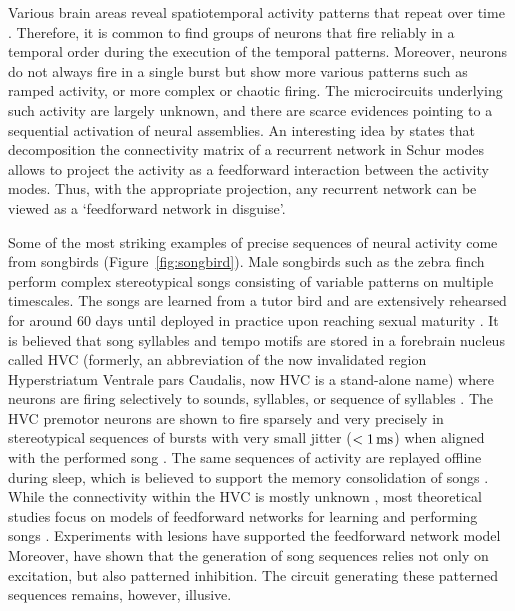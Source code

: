     Various brain areas reveal spatiotemporal activity patterns that repeat
    over time \cite[e.g.,][]{Wilson1994, Kenet2003, Berkes2011}. Therefore, it
    is common to find groups of neurons that fire reliably in a temporal order
    during the execution of the temporal patterns. Moreover, neurons do not
    always fire in a single burst but show more various patterns such as ramped
    activity, or more complex or chaotic firing. The microcircuits
    underlying such activity are largely unknown, and there are scarce
    evidences pointing to a sequential activation of neural assemblies. An
    interesting idea by \cite{Goldman2009} states that decomposition the
    connectivity matrix of a recurrent network in Schur modes allows to project
    the activity as a feedforward interaction between the activity modes. Thus,
    with the appropriate projection, any recurrent network can be viewed as a
    `feedforward network in disguise'.

    Some of the most striking examples of precise sequences of neural activity
    come from songbirds (Figure~\ref{fig:songbird}). Male songbirds such as the zebra finch perform complex
    stereotypical songs consisting of variable patterns on multiple timescales.
    The songs are learned from a tutor bird and are extensively rehearsed for
    around 60 days until deployed in practice upon reaching sexual maturity
    \citep{George1995, Doupe2004}. It is believed that song syllables and tempo
    motifs are stored in a forebrain nucleus called HVC (formerly, an
    abbreviation of the now invalidated region Hyperstriatum Ventrale pars
    Caudalis, now HVC is a stand-alone name) where neurons are firing
    selectively to sounds, syllables, or sequence of syllables \citep{Yu1996}.
    The HVC premotor neurons are shown to fire sparsely and very precisely in
    stereotypical sequences of bursts with very small jitter ($<1\,\rm ms$)
    when aligned with the performed song \citep{Hahnloser2002}. The same
    sequences of activity are replayed offline during sleep, which is believed
    to support the memory consolidation of songs \citep{Dave2000}. While the
    connectivity within the HVC is mostly unknown \citep{Hamaguchi2012,
    Poole2012}, most theoretical studies focus on models of feedforward
    networks for learning and performing songs \citep[e.g.,][]{Li2006,
    Long2010, Hanuschkin2011}. Experiments with lesions have supported the
    feedforward network model \citep{Poole2012} Moreover, \cite{Kosche2015}
    have shown that the generation of song sequences relies not only on
    excitation, but also patterned inhibition. The circuit generating these
    patterned sequences remains, however, illusive.  

